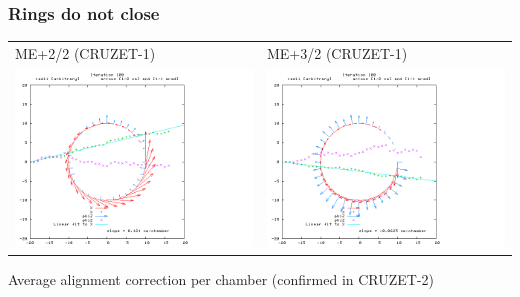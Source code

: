 \documentclass[compress]{beamer}
\begin{document}
\begin{frame}
\frametitle{Rings do not close}
\small

\begin{tabular}{p{0.5\linewidth} p{0.5\linewidth}}
ME+2/2 (CRUZET-1) & ME+3/2 (CRUZET-1) \\
\includegraphics[width=\linewidth]{CRUZET1_MEplus22_plusIsRef_ch1fix_XphiZ.png} &
\includegraphics[width=\linewidth]{CRUZET1_MEplus32_plusIsRef_ch1fix_XphiZ.png}
\end{tabular}

\vspace{0.05 cm}
\begin{center}
Average alignment correction per chamber (confirmed in CRUZET-2)


\end{center}
\end{frame}
\end{document}
